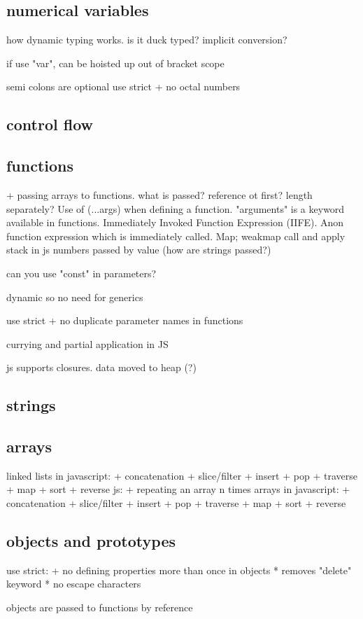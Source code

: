 \subsection{numerical variables}
how dynamic typing works. is it duck typed? implicit conversion?

if use "var", can be hoisted up out of bracket scope

semi colons are optional
use strict
+ no octal numbers
\subsection{control flow}
\subsection{functions}
+ passing arrays to functions. what is passed? reference ot first? length separately?
Use of (...args) when defining a function.
"arguments" is a keyword available in functions.
Immediately Invoked Function Expression (IIFE). Anon function expression which is immediately called.
Map; weakmap
call and apply
stack in js
numbers passed by value
(how are strings passed?)

can you use "const" in parameters?

dynamic so no need for generics

use strict
+ no duplicate parameter names in functions

currying and partial application in JS

js supports closures. data moved to heap (?)
\subsection{strings}
\subsection{arrays}
linked lists in javascript:
+ concatenation
+ slice/filter
+ insert
+ pop
+ traverse
+ map
+ sort
+ reverse
js:
+ repeating an array n times
arrays in javascript:
+ concatenation
+ slice/filter
+ insert
+ pop
+ traverse
+ map
+ sort
+ reverse
\subsection{objects and prototypes}

use strict:
+ no defining properties more than once in objects
  * removes "delete" keyword
  * no escape characters

objects are passed to functions by reference

